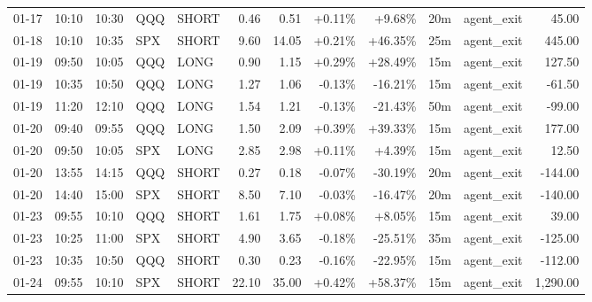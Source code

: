 \documentclass[11pt,a4paper]{article}
\begin{document}
\begin{center}
\begin{longtable}{>{\color{txtmain}}l l l l l r r r r r >{\color{txtmain}}l r}
01-17 & 10:10 & 10:30 & QQQ & SHORT & 0.46 & 0.51 & \textcolor{wingreen}{+0.11\%} & \textcolor{wingreen}{+9.68\%} & 20m & agent\_exit & \textcolor{wingreen}{45.00} \\
01-18 & 10:10 & 10:35 & SPX & SHORT & 9.60 & 14.05 & \textcolor{wingreen}{+0.21\%} & \textcolor{wingreen}{+46.35\%} & 25m & agent\_exit & \textcolor{wingreen}{445.00} \\
01-19 & 09:50 & 10:05 & QQQ & LONG & 0.90 & 1.15 & \textcolor{wingreen}{+0.29\%} & \textcolor{wingreen}{+28.49\%} & 15m & agent\_exit & \textcolor{wingreen}{127.50} \\
01-19 & 10:35 & 10:50 & QQQ & LONG & 1.27 & 1.06 & \textcolor{lossred}{-0.13\%} & \textcolor{lossred}{-16.21\%} & 15m & agent\_exit & \textcolor{lossred}{-61.50} \\
01-19 & 11:20 & 12:10 & QQQ & LONG & 1.54 & 1.21 & \textcolor{lossred}{-0.13\%} & \textcolor{lossred}{-21.43\%} & 50m & agent\_exit & \textcolor{lossred}{-99.00} \\
01-20 & 09:40 & 09:55 & QQQ & LONG & 1.50 & 2.09 & \textcolor{wingreen}{+0.39\%} & \textcolor{wingreen}{+39.33\%} & 15m & agent\_exit & \textcolor{wingreen}{177.00} \\
01-20 & 09:50 & 10:05 & SPX & LONG & 2.85 & 2.98 & \textcolor{wingreen}{+0.11\%} & \textcolor{wingreen}{+4.39\%} & 15m & agent\_exit & \textcolor{wingreen}{12.50} \\
01-20 & 13:55 & 14:15 & QQQ & SHORT & 0.27 & 0.18 & \textcolor{lossred}{-0.07\%} & \textcolor{lossred}{-30.19\%} & 20m & agent\_exit & \textcolor{lossred}{-144.00} \\
01-20 & 14:40 & 15:00 & SPX & SHORT & 8.50 & 7.10 & \textcolor{lossred}{-0.03\%} & \textcolor{lossred}{-16.47\%} & 20m & agent\_exit & \textcolor{lossred}{-140.00} \\
01-23 & 09:55 & 10:10 & QQQ & SHORT & 1.61 & 1.75 & \textcolor{wingreen}{+0.08\%} & \textcolor{wingreen}{+8.05\%} & 15m & agent\_exit & \textcolor{wingreen}{39.00} \\
01-23 & 10:25 & 11:00 & SPX & SHORT & 4.90 & 3.65 & \textcolor{lossred}{-0.18\%} & \textcolor{lossred}{-25.51\%} & 35m & agent\_exit & \textcolor{lossred}{-125.00} \\
01-23 & 10:35 & 10:50 & QQQ & SHORT & 0.30 & 0.23 & \textcolor{lossred}{-0.16\%} & \textcolor{lossred}{-22.95\%} & 15m & agent\_exit & \textcolor{lossred}{-112.00} \\
01-24 & 09:55 & 10:10 & SPX & SHORT & 22.10 & 35.00 & \textcolor{wingreen}{+0.42\%} & \textcolor{wingreen}{+58.37\%} & 15m & agent\_exit & \textcolor{wingreen}{1,290.00} \\

\end{longtable}
\end{center}
\end{document}
